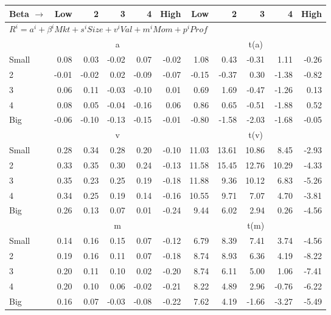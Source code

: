 
\begin{tabular}{lrrrrrrrrrr}
  \toprule
    
    Beta $\rightarrow$ & Low & 2 & 3 & 4 & High & Low & 2 & 3 & 4 & High  \\ 
  \midrule
  \multicolumn{11}{l}{$R^i=a^i+\beta^iMkt+s^iSize+v^iVal+m^iMom+p^iProf$}  \\
  
     & \multicolumn{5}{c}{a} & \multicolumn{5}{c}{t(a)}   \\
     \cmidrule(r){2-6} \cmidrule(r){7-11} 
    Small  & 0.08  & 0.03  & -0.02  & 0.07  & -0.02  & 1.08  & 0.43  & -0.31  & 1.11  & -0.26   \\
    2  & -0.01  & -0.02  & 0.02  & -0.09  & -0.07  & -0.15  & -0.37  & 0.30  & -1.38  & -0.82   \\
    3  & 0.06  & 0.11  & -0.03  & -0.10  & 0.01  & 0.69  & 1.69  & -0.47  & -1.26  & 0.13   \\
    4  & 0.08  & 0.05  & -0.04  & -0.16  & 0.06  & 0.86  & 0.65  & -0.51  & -1.88  & 0.52   \\
    Big  & -0.06  & -0.10  & -0.13  & -0.15  & -0.01  & -0.80  & -1.58  & -2.03  & -1.68  & -0.05   \\

     & \multicolumn{5}{c}{v} & \multicolumn{5}{c}{t(v)}   \\
     \cmidrule(r){2-6} \cmidrule(r){7-11} 
    Small  & 0.28  & 0.34  & 0.28  & 0.20  & -0.10  & 11.03  & 13.61  & 10.86  & 8.45  & -2.93   \\
    2  & 0.33  & 0.35  & 0.30  & 0.24  & -0.13  & 11.58  & 15.45  & 12.76  & 10.29  & -4.33   \\
    3  & 0.35  & 0.23  & 0.25  & 0.19  & -0.18  & 11.88  & 9.36  & 10.12  & 6.83  & -5.26   \\
    4  & 0.34  & 0.25  & 0.19  & 0.14  & -0.16  & 10.55  & 9.71  & 7.07  & 4.70  & -3.81   \\
    Big  & 0.26  & 0.13  & 0.07  & 0.01  & -0.24  & 9.44  & 6.02  & 2.94  & 0.26  & -4.56   \\
    
  
     & \multicolumn{5}{c}{m} & \multicolumn{5}{c}{t(m)}   \\
     \cmidrule(r){2-6} \cmidrule(r){7-11} 
    Small  & 0.14  & 0.16  & 0.15  & 0.07  & -0.12  & 6.79  & 8.39  & 7.41  & 3.74  & -4.56   \\
    2  & 0.19  & 0.16  & 0.11  & 0.07  & -0.18  & 8.74  & 8.93  & 6.36  & 4.19  & -8.22   \\
    3  & 0.20  & 0.11  & 0.10  & 0.02  & -0.20  & 8.74  & 6.11  & 5.00  & 1.06  & -7.41   \\
    4  & 0.20  & 0.10  & 0.06  & -0.02  & -0.21  & 8.22  & 4.89  & 2.96  & -0.76  & -6.22   \\
    Big  & 0.16  & 0.07  & -0.03  & -0.08  & -0.22  & 7.62  & 4.19  & -1.66  & -3.27  & -5.49   \\
    

\end{tabular}
